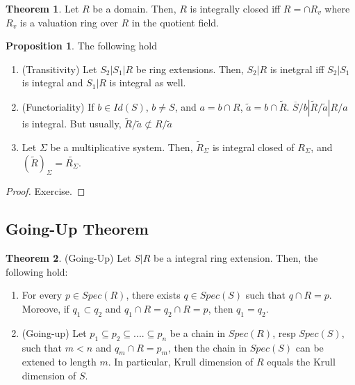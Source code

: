 \documentclass{article}
\theoremstyle{definition}
\newtheorem{theorem}{Theorem}[section]
\theoremstyle{definition}
\theoremstyle{definition}
\newtheorem{proposition}{Proposition}[section]
\theoremstyle{definition}
\theoremstyle{definition}
\theoremstyle{definition}
\theoremstyle{definition}
\begin{document}
\begin{tcolorbox}[colback=red!5!white,colframe=red!30!white]
\begin{theorem}
Let $R$ be a domain. Then, $R$ is integrally closed iff $R=\cap R_v$ where $R_v$ is a valuation ring over $R$ in the quotient field.  
\end{theorem}
\end{tcolorbox}


\begin{tcolorbox}[colback=blue!5!white,colframe=blue!30!white]
\begin{proposition}
The following hold
\begin{enumerate}
    \item (Transitivity) Let $S_2|S_1|R$ be ring extensions. Then, $S_2|R$ is inetgral iff $S_2|S_1$ is integral and $S_1|R$ is integral as well.
    \item (Functoriality) If $b\in Id(S)$, $b\neq S$, and $a=b\cap R$, $\tilde{a}=b\cap \tilde{R}$. $\overline{S}/b|\tilde{R}/\tilde{a}|R/a$ is integral. But usually, $\tilde{R}/\tilde{a}\not \subset R/\tilde{a}$
    \item Let $\Sigma$ be a multiplicative system. Then, $\tilde{R}_{\Sigma}$ is integral closed of $R_{\Sigma}$, and $(\tilde{R})_{\Sigma}=\tilde{R_{\Sigma}}$.
\end{enumerate}
\end{proposition}
\end{tcolorbox}
\begin{proof}
    Exercise. 
\end{proof}


\subsection{Going-Up Theorem}


\begin{tcolorbox}[colback=red!5!white,colframe=red!30!white]
\begin{theorem}
(Going-Up) Let $S|R$ be a integral ring extension. Then, the following hold: 
\begin{enumerate}
    \item For every $p\in Spec(R)$, there exists $q\in Spec(S)$ such that $q\cap R=p$. Moreove, if $q_1\subset q_2$ and $q_1\cap R=q_2\cap R=p$, then $q_1= q_2$.
    \item (Going-up) Let $p_1\subseteq p_2\subseteq ....\subseteq p_n$ be a chain in $Spec(R)$, resp $Spec(S)$, such that $m<n$ and $q_m\cap R=p_m$, then the chain in $Spec(S)$ can be extened to length $m$. In particular, Krull dimension of $R$ equals the Krull dimension of $S$. 
\end{enumerate}
\end{theorem}
\end{tcolorbox}
\end{document}
